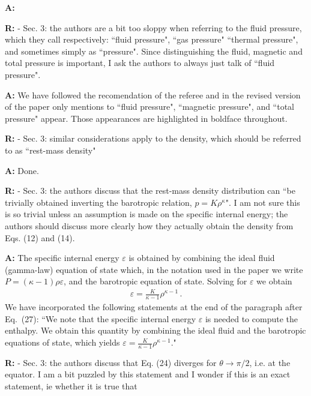 \documentclass{article}
\begin{document}
\bigskip

{\bf A:} 

\bigskip

{\bf R:} - Sec. 3: the authors are a bit too sloppy when referring to the fluid
pressure, which they call respectively: ``fluid pressure", ``gas
pressure" ``thermal pressure", and sometimes simply as ``pressure". Since
distinguishing the fluid, magnetic and total pressure is important, I
ask the authors to always just talk of ``fluid pressure".

\bigskip

{\bf A:} We have followed the recomendation of the referee and in the revised version
of the paper only mentions to ``fluid pressure", ``magnetic pressure", and 
``total pressure" appear. Those appearances are highlighted in boldface
throughout.

\bigskip

{\bf R:} - Sec. 3: similar considerations apply to the density, which should
be referred to as ``rest-mass density"

\bigskip

{\bf A:} Done.

\bigskip

{\bf R:} - Sec. 3: the authors discuss that the rest-mass density distribution can
``be trivially obtained inverting the barotropic relation, $p = K
\rho^{\kappa}$". I am not sure this is so trivial unless an assumption is
made on the specific internal energy; the authors should discuss more
clearly how they actually obtain the density from Eqs. (12) and (14).

\bigskip

{\bf A:} 
The specific internal energy $\varepsilon$ is obtained by combining the ideal fluid (gamma-law)
equation of state which, in the notation used in the paper we write $P=(\kappa-1)\rho\varepsilon$,
and the barotropic equation of state. Solving for $\varepsilon$ we obtain
\begin{eqnarray*}
\varepsilon=\frac{K}{\kappa-1}\rho^{\kappa-1}\,.
\end{eqnarray*}
We have incorporated the following statements at the end of the paragraph after Eq.~(27):
``We note that the specific internal energy $\varepsilon$ is needed to compute the enthalpy. We obtain
this quantity by combining the ideal fluid and the barotropic equations of state, which yields 
$\varepsilon=\frac{K}{\kappa-1}\rho^{\kappa-1}$."


\bigskip

{\bf R:} - Sec. 3: the authors discuss that Eq. (24) diverges for $\theta \rightarrow \pi/2$,
i.e. at the equator. I am a bit puzzled by this statement and I wonder if
this is an exact statement, ie whether it is true that
\end{document}
